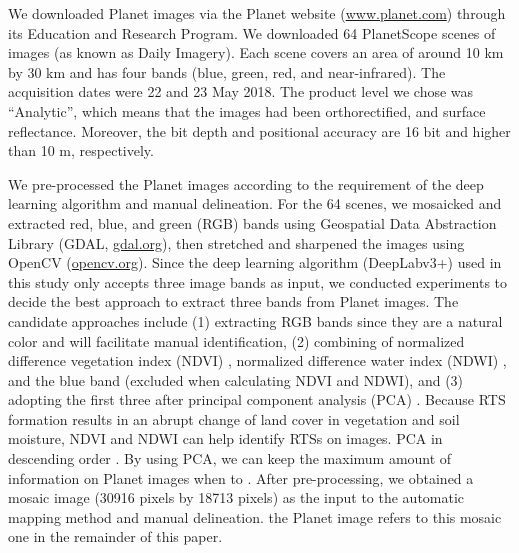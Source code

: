 \documentclass[authoryear,preprint,review,12pt]{elsarticle}
\begin{document}
We downloaded Planet images via the Planet website (\url{www.planet.com}) through its Education and Research Program. We downloaded 64 PlanetScope scenes of images (as known as Daily Imagery). Each scene covers an area of around 10 km by 30 km and has four bands (blue, green, red, and near-infrared). The acquisition dates were 22 and 23 May 2018. The product level we chose was ``Analytic'', which means that the images had been orthorectified, and  surface reflectance. Moreover, the bit depth and positional accuracy are 16 bit and higher than 10 m, respectively. %

We pre-processed the Planet images according to the requirement of the deep learning algorithm and manual delineation. For the 64 scenes, we mosaicked and extracted red, blue, and green (RGB) bands using Geospatial Data Abstraction Library (GDAL, \url{gdal.org}), then stretched and sharpened the images using OpenCV (\url{opencv.org}). Since the deep learning algorithm (DeepLabv3+) used in this study only accepts three image bands as input, we conducted experiments to decide the best approach to extract three bands from Planet images. The candidate approaches include (1) extracting RGB bands since they are a natural color and will facilitate manual identification, (2) combining of normalized difference vegetation index (NDVI) \citep{rouse1974monitoring}, normalized difference water index (NDWI) \citep{mcfeeters1996use}, and the blue band (excluded when calculating NDVI and NDWI), and (3) adopting the first three  after  principal component analysis (PCA) . Because RTS formation results in an abrupt change of land cover in vegetation and soil moisture,  NDVI and NDWI can help identify RTSs on images. PCA  in descending order  \citep{wold1987principal}.  By using PCA, we can keep the maximum amount of information on Planet images when  to . 
 After pre-processing, we obtained a mosaic image (30916 pixels by 18713 pixels) as the input to the automatic mapping method and manual delineation.  the Planet image refers to this mosaic one in the remainder of this paper.
\end{document}
